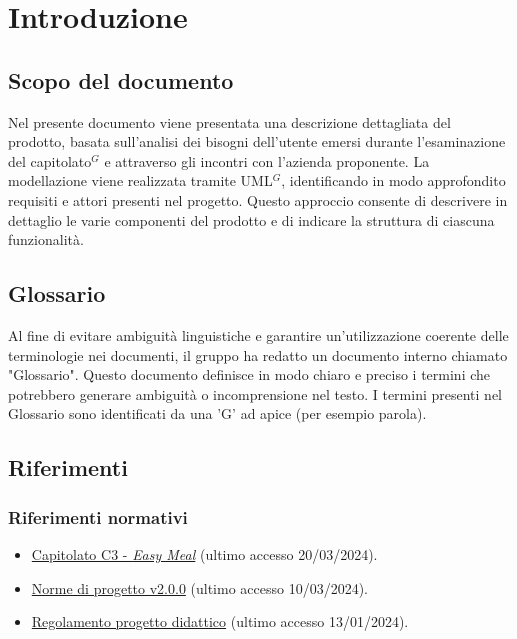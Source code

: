 \section{Introduzione}

\subsection{Scopo del documento}
Nel presente documento viene presentata una descrizione dettagliata del prodotto, basata sull'analisi dei bisogni dell'utente emersi durante l'esaminazione del capitolato$^G$ e attraverso gli incontri con l'azienda proponente. 
La modellazione viene realizzata tramite UML$^G$, identificando in modo approfondito requisiti e attori presenti nel progetto. 
Questo approccio consente di descrivere in dettaglio le varie componenti del prodotto e di indicare la struttura di ciascuna funzionalità.

\subsection{Glossario}
Al fine di evitare ambiguità linguistiche e garantire un'utilizzazione coerente delle terminologie nei documenti, il gruppo ha redatto un documento interno chiamato "Glossario". Questo
documento definisce in modo chiaro e preciso i termini che potrebbero generare ambiguità
o incomprensione nel testo. I termini presenti nel Glossario sono identificati da una 'G' ad
apice (per esempio parola\g).

\subsection{Riferimenti}
\subsubsection{Riferimenti normativi}
\begin{itemize}
    \item \href{https://www.math.unipd.it/~tullio/IS-1/2023/Progetto/C3.pdf}{Capitolato C3 - \textit{Easy Meal}} (ultimo accesso 20/03/2024).
    \item \href{https://project-swenergy.github.io/}{Norme di progetto v2.0.0} (ultimo accesso 10/03/2024). 
    \item \href{https://www.math.unipd.it/~tullio/IS-1/2023/Dispense/PD2.pdf}{Regolamento progetto didattico} (ultimo accesso 13/01/2024). 
\end{itemize}

